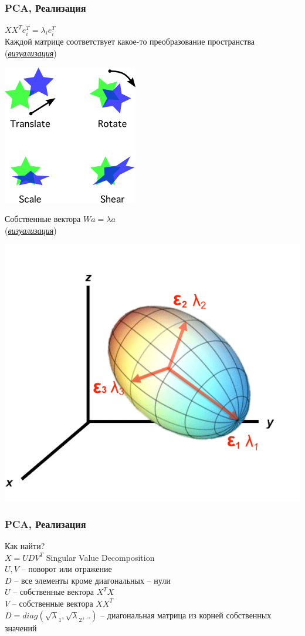 \documentclass[14pt]{beamer}
\begin{document}
\begin{frame}
\frametitle{PCA, Реализация}
	$XX^Te_i^T=\lambda_ie_i^T$\\
	Каждой матрице соответствует какое-то преобразование пространства
	(\href{http://setosa.io/ev/eigenvectors-and-eigenvalues/}{\textit{визуализация}})\\

	\begin{center}
	  \includegraphics[width=0.3\linewidth]{transform.png}\\
	\end{center}
\end{frame}

\begin{frame}
	Собственные вектора $Wa=\lambda a$\\
	(\href{https://www.desmos.com/calculator/ivo6j1pyex}{\textit{визуализация}})\\
	\begin{center}
	  \includegraphics[width=0.5\linewidth]{eigen.png}\\
	\end{center}
\end{frame}

\begin{frame}
\frametitle{PCA, Реализация}
	Как найти?\\
	$X=UDV^T$ Singular Value Decomposition\\
	$U,V$ -- поворот или отражение\\
	$D$ -- все элементы кроме диагональных -- нули\\
	\vspace{1em}
	\pause
	$U$ -- собственные вектора $X^TX$\\
	$V$ -- собственные вектора $XX^T$\\
	$D=diag(\sqrt\lambda_1,\sqrt\lambda_2,..)$ -- диагональная матрица из корней собственных значений\\
\end{frame}
\end{document}
